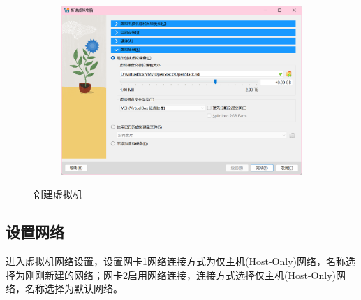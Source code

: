 \documentclass{article}
\begin{document}
\begin{figure}[H]
\begin{subfigure}[b]{0.45\textwidth}
        \includegraphics[width=\textwidth]{img/2.3.png}
    \end{subfigure}
    \caption{创建虚拟机}
\end{figure}

\subsection{设置网络}

进入虚拟机网络设置，设置网卡1网络连接方式为仅主机(Host-Only)网络，名称选择为刚刚新建的网络；网卡2启用网络连接，连接方式选择仅主机(Host-Only)网络，名称选择为默认网络。
\end{document}
